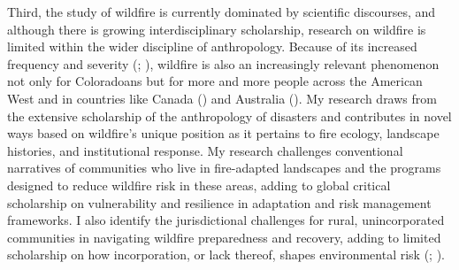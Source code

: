 \documentclass[
]{article}
\begin{document}
Third, the study of wildfire is currently dominated by scientific discourses, and although there is growing interdisciplinary scholarship, research on wildfire is limited within the wider discipline of anthropology. Because of its increased frequency and severity (; ), wildfire is also an increasingly relevant phenomenon not only for Coloradoans but for more and more people across the American West and in countries like Canada () and Australia (). My research draws from the extensive scholarship of the anthropology of disasters and contributes in novel ways based on wildfire's unique position as it pertains to fire ecology, landscape histories, and institutional response. My research challenges conventional narratives of communities who live in fire-adapted landscapes and the programs designed to reduce wildfire risk in these areas, adding to global critical scholarship on vulnerability and resilience in adaptation and risk management frameworks. I also identify the jurisdictional challenges for rural, unincorporated communities in navigating wildfire preparedness and recovery, adding to limited scholarship on how incorporation, or lack thereof, shapes environmental risk (; ).
\end{document}
